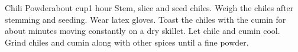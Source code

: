 \begin{recipe}{Chili Powder}{about \unit[1]{cup}}{1 hour}
Stem, slice and seed chiles. Weigh the chiles after stemming and seeding.  Wear latex gloves.
Toast the chiles with the cumin for about \unit[3--4]{minutes} moving constantly on a dry skillet.  Let chile and cumin cool.
Grind chiles and cumin along with other spices until a fine powder.
\end{recipe}
